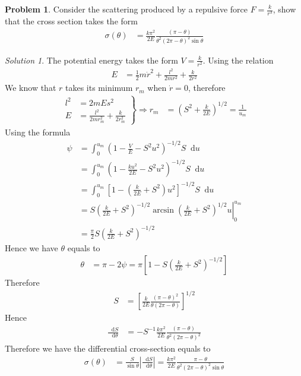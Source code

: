 \documentclass[twoside,11pt]{article}
\newcommand{\lms}{\fontfamily{lmss}\selectfont} %
\renewcommand*\d{\mathop{}\!\mathrm{d}}
\theoremstyle{definition}
\newtheorem{problem}{\lms Problem}
\theoremstyle{remark}
\newtheorem*{solution}{\lms Solution}
\begin{document}
\begin{problem}
Consider the scattering produced by a repulsive force $F=\frac{k}{r^3}$,
show that the cross section takes the form
\begin{align}
    \sigma(\theta) &= 
    \frac{k\pi^2}{2E}
    \frac{(\pi - \theta)}{\theta^2(2\pi - \theta)^2\sin\theta}
\end{align}
\end{problem}
\begin{solution}
The potential energy takes the form $V=\frac{k}{r^2}$.
Using the relation
\begin{align*}
    E &= \frac{1}{2}m\dot r^2 + \frac{l^2}{2mr^2} + \frac{k}{2r^2}
\end{align*}
We know that $r$ takes its minimum $r_m$ when $\dot{r}=0$, therefore
\begin{align*}
    \left.
    \begin{aligned}
            l^2 &= 2mEs^2\\
            E &= \frac{l^2}{2mr_m^2} + \frac{k}{2r_m^2}
    \end{aligned}
    \right\}
    \Rightarrow
    r_m &= \left(S^2 + \frac{k}{2E}\right)^{1/2} = \frac{1}{u_m}
\end{align*}
Using the formula
\begin{align*}
    \psi 
    &= 
    \int_0^{u_m}
    \left( 1 - \frac{V}{E} - S^2 u^2 \right)^{-1/2}S\d u\\
    &=
    \int_0^{u_m}
    \left( 1 - \frac{ku^2}{2E} - S^2 u^2 \right)^{-1/2}S\d u\\
    &= 
    \int_0^{u_m}
    \left[ 1 - \left(\frac{k}{2E} + S^2\right)u^2 \right]^{-1/2}S\d u\\
    &= 
    S\left(\frac{k}{2E} + S^2\right)^{-1/2}
    \left.
        \arcsin\left(\frac{k}{2E} + S^2\right)^{1/2} u
    \right|_0^{u_m}\\
    &= \frac{\pi}{2}
    S\left(\frac{k}{2E} + S^2\right)^{-1/2}
\end{align*}
Hence we have $\theta$ equals to
\begin{align*}
    \theta 
    &= 
    \pi - 2\psi 
    = \pi\left[
        1 - 
    S\left(\frac{k}{2E} + S^2\right)^{-1/2}
    \right]
\end{align*}
Therefore
\begin{align*}
    S &= \left[
        \frac{k}{2E}\frac{(\pi - \theta)^2}{\theta(2\pi - \theta)}
    \right]^{1/2}
\end{align*}
Hence
\begin{align*}
    \frac{\d S}{\d\theta} &= 
    -S^{-1}\frac{k\pi^2}{2E}\frac{(\pi - \theta)}{\theta^2(2\pi - \theta)^2}
\end{align*}
Therefore we have the differential cross-section equals to
\begin{align*}
    \sigma(\theta) &= 
    \frac{S}{\sin\theta} \left|\frac{\d S}{\d \theta}\right|
    = \frac{k\pi^2}{2E}\frac{\pi - \theta}{\theta^2 (2\pi - \theta)^2\sin\theta}
\end{align*}

\end{solution}
\end{document}
